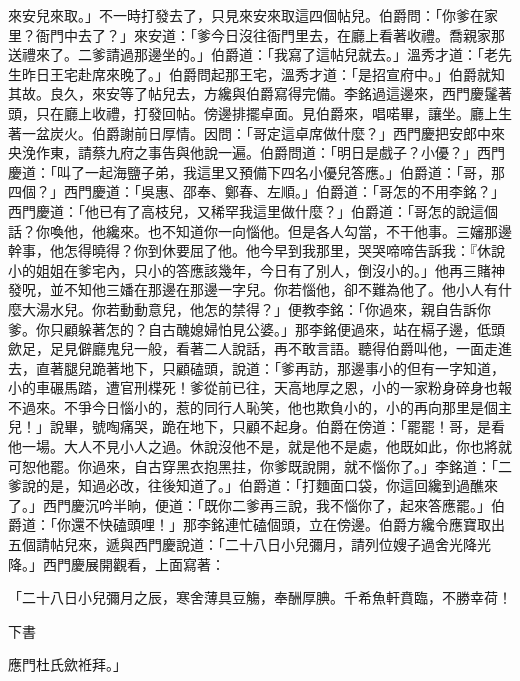 來安兒來取。」不一時打發去了，只見來安來取這四個帖兒。伯爵問：「你爹在家里？衙門中去了？」來安道：「爹今日沒往衙門里去，在廳上看著收禮。喬親家那送禮來了。二爹請過那邊坐的。」伯爵道：「我寫了這帖兒就去。」溫秀才道：「老先生昨日王宅赴席來晚了。」伯爵問起那王宅，溫秀才道：「是招宣府中。」伯爵就知其故。良久，來安等了帖兒去，方纔與伯爵寫得完備。李銘過這邊來，西門慶鬔著頭，只在廳上收禮，打發回帖。傍邊排擺卓面。見伯爵來，唱喏畢，讓坐。廳上生著一盆炭火。伯爵謝前日厚情。因問：「哥定這卓席做什麼？」西門慶把安郎中來央浼作東，請蔡九府之事告與他說一遍。伯爵問道：「明日是戲子？小優？」西門慶道：「叫了一起海鹽子弟，我這里又預備下四名小優兒答應。」伯爵道：「哥，那四個？」西門慶道：「吳惠、邵奉、鄭春、左順。」伯爵道：「哥怎的不用李銘？」西門慶道：「他已有了高枝兒，又稀罕我這里做什麼？」伯爵道：「哥怎的說這個話？你喚他，他纔來。也不知道你一向惱他。但是各人勾當，不干他事。三嬸那邊幹事，他怎得曉得？你到休要屈了他。他今早到我那里，哭哭啼啼告訴我：『休說小的姐姐在爹宅內，只小的答應該幾年，今日有了別人，倒沒小的。」他再三賭神發呪，並不知他三嬏在那邊在那邊一字兒。你若惱他，卻不難為他了。他小人有什麼大湯水兒。你若動動意兒，他怎的禁得？」便教李銘：「你過來，親自告訴你爹。你只顧躲著怎的？自古醜媳婦怕見公婆。」那李銘便過來，站在槅子邊，低頭歛足，足見僻廳鬼兒一般，看著二人說話，再不敢言語。聽得伯爵叫他，一面走進去，直著腿兒跪著地下，只顧磕頭，說道：「爹再訪，那邊事小的但有一字知道，小的車碾馬踏，遭官刑楪死！爹從前已往，天高地厚之恩，小的一家粉身碎身也報不過來。不爭今日惱小的，惹的同行人恥笑，他也欺負小的，小的再向那里是個主兒！」說畢，號啕痛哭，跪在地下，只顧不起身。伯爵在傍道：「罷罷！哥，是看他一場。大人不見小人之過。休說沒他不是，就是他不是處，他既如此，你也將就可恕他罷。你過來，自古穿黑衣抱黑拄，你爹既說開，就不惱你了。」李銘道：「二爹說的是，知過必改，往後知道了。」伯爵道：「打麵面口袋，你這回纔到過醮來了。」西門慶沉吟半晌，便道：「既你二爹再三說，我不惱你了，起來答應罷。」伯爵道：「你還不快磕頭哩！」那李銘連忙磕個頭，立在傍邊。伯爵方纔令應寶取出五個請帖兒來，遞與西門慶說道：「二十八日小兒彌月，請列位嫂子過舍光降光降。」西門慶展開觀看，上面寫著：

「二十八日小兒彌月之辰，寒舍薄具豆觴，奉酬厚腆。千希魚軒賁臨，不勝幸荷！

下書

應門杜氏歛袵拜。」

